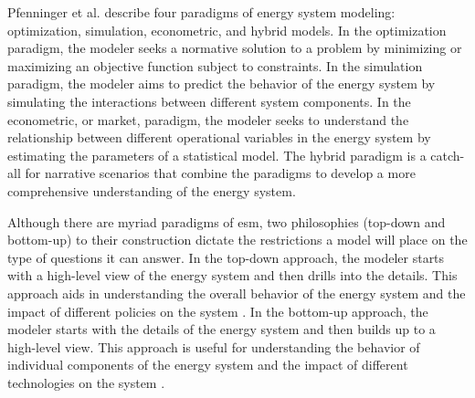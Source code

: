 Pfenninger et al. \cite{pfenninger_energy_2014} describe four paradigms of
energy system modeling: optimization, simulation, econometric, and hybrid
models. In the optimization paradigm, the modeler seeks a normative solution to
a problem by minimizing or maximizing an objective function subject to
constraints. In the simulation paradigm, the modeler aims to predict the
behavior of the energy system by simulating the interactions between different
system components. In the econometric, or market, paradigm, the modeler seeks
to understand the relationship between different operational variables in the
energy system by estimating the parameters of a statistical model. The hybrid
paradigm is a catch-all for narrative scenarios that combine the paradigms to
develop a more comprehensive understanding of the energy system.

Although there are myriad paradigms of \gls{esm}, two philosophies (top-down
and bottom-up) to their construction dictate the restrictions a model will
place on the type of questions it can answer. In the top-down approach, the
modeler starts with a high-level view of the energy system and then drills into
the details. This approach aids in understanding the overall behavior of the
energy system and the impact of different policies on the system
\cite{laha_energy_2017}. In the bottom-up approach, the modeler starts with the
details of the energy system and then builds up to a high-level view. This
approach is useful for understanding the behavior of individual components of
the energy system and the impact of different technologies on the system
\cite{ipcc_ch2_2000,laha_energy_2017}.

